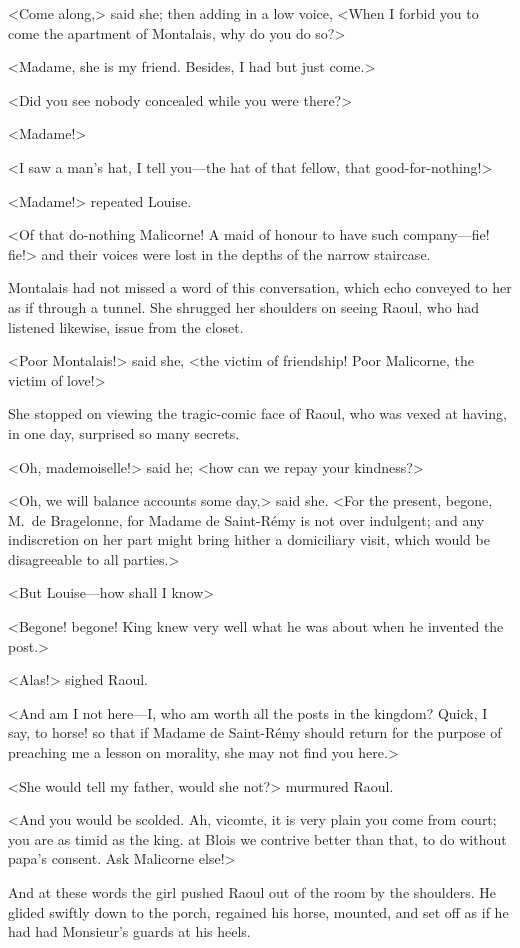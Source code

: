 <Come along,> said she; then adding in a low voice, <When I forbid you to come the apartment of Montalais, why do you do so?>

<Madame, she is my friend. Besides, I had but just come.>

<Did you see nobody concealed while you were there?>

<Madame!>

<I saw a man's hat, I tell you—the hat of that fellow, that good-for-nothing!>

<Madame!> repeated Louise.

<Of that do-nothing Malicorne! A maid of honour to have such company—fie! fie!> and their voices were lost in the depths of the narrow staircase.

Montalais had not missed a word of this conversation, which echo conveyed to her as if through a tunnel. She shrugged her shoulders on seeing Raoul, who had listened likewise, issue from the closet.

<Poor Montalais!> said she, <the victim of friendship! Poor Malicorne, the victim of love!>

She stopped on viewing the tragic-comic face of Raoul, who was vexed at having, in one day, surprised so many secrets.

<Oh, mademoiselle!> said he; <how can we repay your kindness?>

<Oh, we will balance accounts some day,> said she. <For the present, begone, M.~de Bragelonne, for Madame de Saint-Rémy is not over indulgent; and any indiscretion on her part might bring hither a domiciliary visit, which would be disagreeable to all parties.>

<But Louise—how shall I know\longdash>

<Begone! begone! King  knew very well what he was about when he invented the post.>

<Alas!> sighed Raoul.

<And am I not here—I, who am worth all the posts in the kingdom? Quick, I say, to horse! so that if Madame de Saint-Rémy should return for the purpose of preaching me a lesson on morality, she may not find you here.>

<She would tell my father, would she not?> murmured Raoul.

<And you would be scolded. Ah, vicomte, it is very plain you come from court; you are as timid as the king.  at Blois we contrive better than that, to do without papa's consent. Ask Malicorne else!>

And at these words the girl pushed Raoul out of the room by the shoulders. He glided swiftly down to the porch, regained his horse, mounted, and set off as if he had had Monsieur's guards at his heels. 
